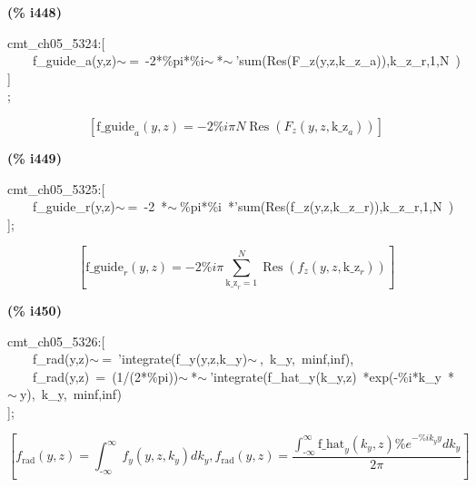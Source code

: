 \documentclass[fleqn]{article}
\begin{document}
\noindent
\begin{minipage}[t]{4.000000em}\color{red}\bfseries
(\% i448)	
\end{minipage}
\begin{minipage}[t]{\textwidth}\color{blue}
cmt\_ch05\_5324:[\\
\ \ \ \ f\_guide\_a(y,z)\ensuremath{\sim\ }=\ -2*\%pi*\%i\ensuremath{\sim\ }*\ensuremath{\sim\ }'sum(Res(F\_z(y,z,k\_z\_a)),k\_z\_r,1,N\ )\\
]\\
;
\end{minipage}
\[\displaystyle \tag{\% o448} 
\left[ {{\ensuremath{\mathrm{f\_ guide}}}_a}\left( y\operatorname{,}z\right) =-2 \% i \ensuremath{\pi}  N \operatorname{Res}\left( {F_z}\left( y\operatorname{,}z\operatorname{,}{{\ensuremath{\mathrm{k\_ z}}}_a}\right) \right) \right] \mbox{}
\]


\noindent
\begin{minipage}[t]{4.000000em}\color{red}\bfseries
(\% i449)	
\end{minipage}
\begin{minipage}[t]{\textwidth}\color{blue}
cmt\_ch05\_5325:[\\
\ \ \ \ f\_guide\_r(y,z)\ensuremath{\sim\ }=\ -2\ *\ensuremath{\sim\ }\%pi*\%i\ *'sum(Res(f\_z(y,z,k\_z\_r)),k\_z\_r,1,N\ )\\
];
\end{minipage}
\[\displaystyle \tag{\% o449} 
\left[ {{\ensuremath{\mathrm{f\_ guide}}}_r}\left( y\operatorname{,}z\right) =-2 \% i \ensuremath{\pi}  \sum_{{{\ensuremath{\mathrm{k\_ z}}}_r}=1}^{N}{\left. \operatorname{Res}\left( {f_z}\left( y\operatorname{,}z\operatorname{,}{{\ensuremath{\mathrm{k\_ z}}}_r}\right) \right) \right.}\right] \mbox{}
\]


\noindent
\begin{minipage}[t]{4.000000em}\color{red}\bfseries
(\% i450)	
\end{minipage}
\begin{minipage}[t]{\textwidth}\color{blue}
cmt\_ch05\_5326:[\\
\ \ \ \ f\_rad(y,z)\ensuremath{\sim\ }=\ 'integrate(f\_y(y,z,k\_y)\ensuremath{\sim\ },\ k\_y,\ minf,inf),\\
\ \ \ \ f\_rad(y,z)\ =\ (1/(2*\%pi))\ensuremath{\sim\ }*\ensuremath{\sim\ }'integrate(f\_hat\_y(k\_y,z)\ *exp(-\%i*k\_y\ *\ensuremath{\sim\ }y),\ k\_y,\ minf,inf)\\
];
\end{minipage}
\[\displaystyle \tag{\% o450} 
\left[ {f_{\ensuremath{\mathrm{rad}}}}\left( y\operatorname{,}z\right) =\int_{\operatorname{-}\infty }^{\infty }{\left. {f_y}\left( y\operatorname{,}z\operatorname{,}{k_y}\right) d{k_y}\right.}\operatorname{,}{f_{\ensuremath{\mathrm{rad}}}}\left( y\operatorname{,}z\right) =\frac{\int_{\operatorname{-}\infty }^{\infty }{\left. {{\ensuremath{\mathrm{f\_ hat}}}_y}\left( {k_y}\operatorname{,}z\right)  {{\% e}^{-\% i {k_y} y}}d{k_y}\right.}}{2 \ensuremath{\pi} }\right] \mbox{}
\]
\end{document}
